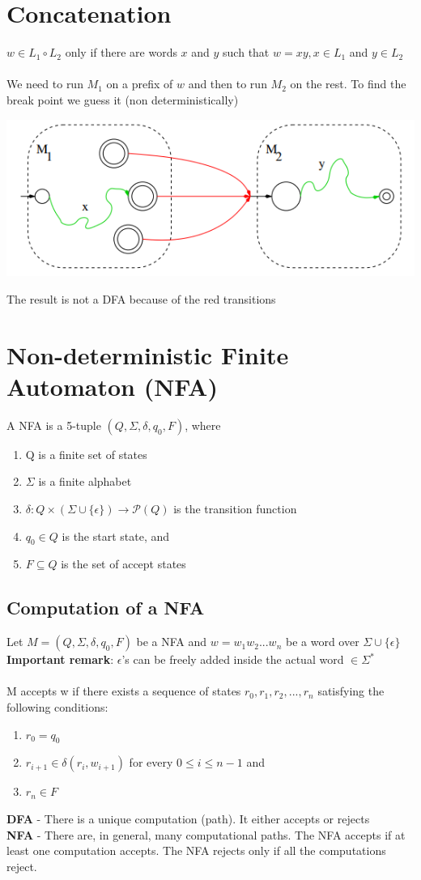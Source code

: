 \documentclass{article}[18pt]
\begin{document}
\section{Concatenation}
$w\in L_1 \circ L_2$ only if there are words $x$ and $y$ such that $w=xy, x\in L_1$ and $y\in L_2$\\
\\
We need to run $M_1$ on a prefix of $w$ and then to run $M_2$ on the rest. To find the break point we guess it (non deterministically)
\begin{center}
	\includegraphics[scale=0.7]{concatenation}
\end{center}
The result is not a DFA because of the red transitions
\section{Non-deterministic Finite Automaton (NFA)}
A NFA is a 5-tuple $(Q,\Sigma, \delta, q_0, F)$, where
\begin{enumerate}
	\item Q is a finite set of states
	\item $\Sigma$ is a finite alphabet
	\item $\delta: Q\times (\Sigma\cup \{\epsilon\})\rightarrow \mathscr{P}(Q)$ is the transition function
	\item $q_0\in Q$ is the start state, and
	\item $F\subseteq Q$ is the set of accept states
\end{enumerate}
\subsection{Computation of a NFA}
Let $M=(Q,\Sigma, \delta, q_0, F)$ be a NFA and $w=w_1w_2...w_n$ be a word over $\Sigma\cup \{\epsilon\}$\\
\textbf{Important remark}: $\epsilon$'s can be freely added inside the actual word $\in\Sigma^*$\\
\\
M accepts w if there exists a sequence of states $r_0,r_1,r_2,...,r_n$ satisfying the following conditions:
\begin{enumerate}
	\item $r_0=q_0$
	\item $r_{i+1}\in \delta(r_i,w_{i+1})$ for every $0\leqslant i\leqslant n-1$ and
	\item $r_n\in F$
\end{enumerate}
\textbf{DFA} - There is a unique computation (path). It either accepts or rejects\\
\textbf{NFA} - There are, in general, many computational paths. The NFA accepts if at least one computation accepts. The NFA rejects only if all the computations reject.
\end{document}
